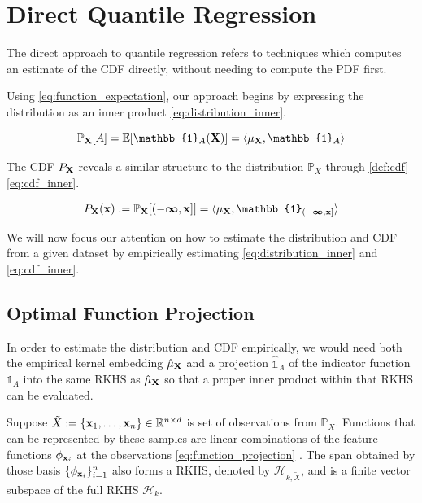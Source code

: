 \documentclass[twoside]{article} \usepackage{aistats2017}
\theoremstyle{definition}
\theoremstyle{theorem}
\newcommand{\rv}[1]{{#1}}
\newcommand{\ds}[1]{\tilde{#1}}
\begin{document}
\section{Direct Quantile Regression}
\label{sec:direct_quantile_regression}

	The direct approach to quantile regression refers to techniques which computes an estimate of the CDF directly, without needing to compute the PDF first.
	
	Using \eqref{eq:function_expectation}, our approach begins by expressing the distribution as an inner product \eqref{eq:distribution_inner}.
		
	\begin{equation}
		\mathbb{P}_{\bvec{\rv{X}}}[A] = \mathbb{E}[\mathbb{1}_{A}(\bvec{\rv{X}})] = \langle \mu_{\bvec{\rv{X}}}, \mathbb{1}_{A} \rangle
	\label{eq:distribution_inner}
	\end{equation}

	The CDF  $P_{\bvec{\rv{X}}}$ reveals a similar structure to the distribution $\mathbb{P}_{\rv{X}}$ through \cref{def:cdf} \eqref{eq:cdf_inner}.
			
	\begin{equation}
		P_{\bvec{\rv{X}}}(\bvec{x}) := \mathbb{P}_{\bvec{\rv{X}}}[(-\bm{\infty}, \bvec{x}]] = \langle \mu_{\bvec{\rv{X}}}, \mathbb{1}_{(-\bm{\infty}, \bvec{x}]} \rangle
	\label{eq:cdf_inner}
	\end{equation}

	We will now focus our attention on how to estimate the distribution and CDF from a given dataset by empirically estimating \eqref{eq:distribution_inner} and \eqref{eq:cdf_inner}.
	
	\subsection{Optimal Function Projection}
	\label{sec:direct_quantile_regression:optimal_function_approximation}
	
		In order to estimate the distribution and CDF empirically, we would need both the empirical kernel embedding $\hat{\mu}_{\bvec{\rv{X}}}$ and a projection $\hat{\mathbb{1}}_{A}$ of the indicator function $\mathbb{1}_{A}$ into the same RKHS as $\hat{\mu}_{\bvec{\rv{X}}}$ so that a proper inner product within that RKHS can be evaluated.

		Suppose $\ds{X} := \{\bvec{x}_{1}, \dots, \bvec{x}_{n}\} \in \mathbb{R}^{n \times d}$ is set of observations from $\mathbb{P}_{\rv{X}}$. Functions that can be represented by these samples are linear combinations of the feature functions $\phi_{\mathbf{x}_{i}}$ at the observations \eqref{eq:function_projection} \citep{muandet2016kernel}. The span obtained by those basis $\{\phi_{\mathbf{x}_{i}}\}_{i = 1}^{n}$ also forms a RKHS, denoted by $\mathcal{H}_{k, \ds{X}}$, and is a finite vector subspace of the full RKHS $\mathcal{H}_{k}$.
		
\end{document}
